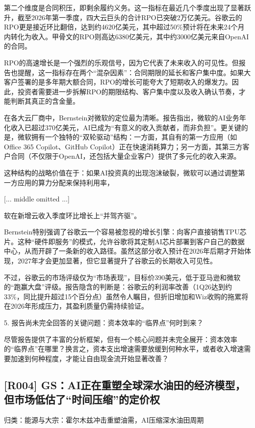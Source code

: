 \documentclass[11pt]{ctexart}
\begin{document}
第二个维度是合同积压，即剩余履约义务。这一指标在最近几个季度出现了显著跃升，截至2026年第一季度，四大云巨头的合计RPO已突破2万亿美元。谷歌云的RPO更是接近环比翻倍，达到约4620亿美元，其中超过50\%预计将在未来24个月内转化为收入。甲骨文的RPO则高达6380亿美元，其中约3000亿美元来自OpenAI的合同。

RPO的高速增长是一个强烈的乐观信号，因为它代表了未来收入的可见性。但报告也提醒，这一指标存在两个“混杂因素”：合同期限的延长和客户集中度。如果大客户签署的是多年期大额合同，RPO的增长可能夸大了短期收入的爆发力。因此，投资者需要进一步拆解RPO的期限结构、客户集中度以及收入确认节奏，才能判断其真正的含金量。

在各大云厂商中，Bernstein对微软的定位最为清晰。报告指出，微软的AI业务年化收入已超过370亿美元，AI已成为“有意义的收入贡献者，而非负担”。更关键的是，微软拥有一个独特的“双轮驱动”结构：一方面，其自有的第一方应用（如Office 365 Copilot、GitHub Copilot）正在快速消耗算力；另一方面，其第三方客户合同（不仅限于OpenAI，还包括大量企业客户）提供了多元化的收入来源。

这种结构的战略价值在于：如果AI投资真的出现泡沫破裂，微软可以通过调整第一方应用的算力分配来保持利用率，

[... middle omitted ...]

软在新增云收入季度环比增长上“并驾齐驱”。

Bernstein特别强调了谷歌云一个容易被忽视的增长引擎：向客户直接销售TPU芯片。这种“硬件即服务”的模式，允许谷歌将其定制AI芯片部署到客户自己的数据中心，从而开辟了一条新的收入路径。虽然这部分收入预计在2026年后期才开始体现，2027年才会更加显著，但它显著提升了谷歌云的长期收入可见性。

不过，谷歌云的市场评级仅为“市场表现”，目标价390美元，低于亚马逊和微软的“跑赢大盘”评级。报告隐含的判断是：谷歌云的利润率改善（1Q26达到约33\%，同比提升超过15个百分点）虽然令人瞩目，但折旧增加和Wiz收购的拖累将在2026年形成压力，其盈利质量仍需持续验证。

5. 报告尚未完全回答的关键问题：资本效率的“临界点”何时到来？

尽管报告提供了丰富的分析框架，但有一个核心问题并未完全展开：资本效率的“临界点”在哪里？换言之，资本支出增速需要放缓到何种水平，或者收入增速需要加速到何种程度，才能让自由现金流开始显著改善？

\subsection{[R004] GS：AI正在重塑全球深水油田的经济模型，但市场低估了“时间压缩”的定价权}
{\small\color{refgray}归类：能源与大宗：霍尔木兹冲击重塑油需，AI压缩深水油田周期}
\end{document}
